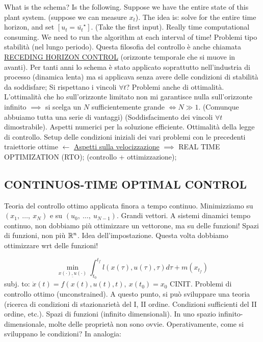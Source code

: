 What is the schema? Is the following. Suppose we have the entire state of this plant system. (suppose we can measure $x_t$). The idea is: solve for the entire time horizon, and set $[u_t = \bar{u_t}^\star]$. (Take the first input). Really time computational consuming. We need to run the algorithm at each interval of time! Problemi tipo stabilità (nel lungo periodo). Questa filosofia del controllo è anche chiamata \underline{RECEDING HORIZON CONTROL} (orizzonte temporale che si muove in avanti). Per tanti anni lo schema è stato applicato soprattutto nell'industria di processo (dinamica lenta) ma si applicava senza avere delle condizioni di stabilità da soddisfare;
Si rispettano i vincoli $\forall t$? Problemi anche di ottimalità. L'ottimalità che ho sull'orizzonte limitato non mi garantisce nulla sull'orizzonte infinito $\implies$ si scelga un $N$ sufficientemente grande $\iff N \gg 1$. (Comunque abbuiamo tutta una serie di vantaggi) (Soddisfacimento dei vincoli $\forall t$ dimostrabile). Aspetti numerici per la soluzione efficiente. Ottimalità della legge di controllo. Setup delle condizioni iniziali dei vari problemi con le precedenti traiettorie ottime $\leftarrow$ \underline{Aspetti sulla velocizzazione} $\implies$ REAL TIME OPTIMIZATION (RTO); (controllo + ottimizzazione);

\subsection{CONTINUOS-TIME OPTIMAL CONTROL}

Teoria del controllo ottimo applicata finora a tempo continuo. \newline Minimizziamo su $(x_1,\ \dots,\ x_N)$ e su $(u_0,\ \dots,\ u_{N-1})$. Grandi vettori. A sistemi dinamici tempo continuo, non dobbiamo più ottimizzare un vettorone, ma su delle funzioni! Spazi di funzioni, non più $\mathbb{R}^n$. Idea dell'impostazione. Questa volta dobbiamo ottimizzare wrt delle funzioni!

\[
	\min_{\underline{x(\mathord{\cdot}),u(\mathord{\cdot})}}{\int_{t_0}^{t_f}{l(x(\tau),u(\tau),\tau)d\tau} + m(x_{t_f})}
\]
subj. to: $\dot{x}(t) = f(x(t),u(t),t),\ x(t_0)=x_0$ CINIT.
Problemi di controllo ottimo (unconstrained). A questo punto, si può sviluppare una teoria (ricerca di condizioni di stazionarietà del I, II ordine. Condizioni sufficienti del II ordine, etc.). Spazi di funzioni (infinito dimensionali). In uno spazio infinito-dimensionale, molte delle proprietà non sono ovvie.
Operativamente, come si sviluppano le condizioni? In analogia:

